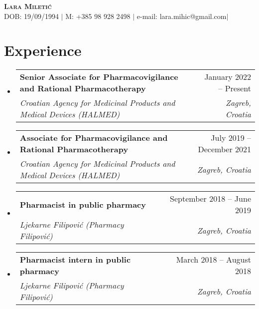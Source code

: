 \documentclass[letterpaper,11pt]{article}
\makeatletter
\newcommand{\resumeItem}[1]{
  \item\small{
    {#1 \vspace{-2pt}}
  }
}
\newcommand{\resumeSubheading}[4]{
  \vspace{-2pt}\item
    \begin{tabular*}{0.97\textwidth}[t]{l@{\extracolsep{\fill}}r}
      \textbf{#1} & #2 \\
      \textit{\small#3} & \textit{\small #4} \\
    \end{tabular*}\vspace{-7pt}
}
\newcommand{\resumeSubHeadingListStart}{\begin{itemize}[leftmargin=0.15in, label={}]}
\newcommand{\resumeSubHeadingListEnd}{\end{itemize}}
\newcommand{\resumeItemListStart}{\begin{itemize}}
\newcommand{\resumeItemListEnd}{\end{itemize}\vspace{-5pt}}
\makeatother
\begin{document}
\begin{center}
    \textbf{\Huge \scshape Lara Miletić} \\ \vspace{1pt}
    \small DOB: 19/09/1994 $|$
    \small M: +385 98 928 2498 $|${ e-mail: lara.mihic@gmail.com}$|$

\end{center}
\section{{Experience}}
  \resumeSubHeadingListStart
      \resumeSubheading
      {{Senior Associate for Pharmacovigilance and Rational Pharmacotherapy}}{January 2022 -- Present}
      {Croatian Agency for Medicinal Products and Medical Devices (HALMED)}{Zagreb, Croatia}

    \resumeSubheading
      {{Associate for Pharmacovigilance and Rational Pharmacotherapy}}{July 2019 -- December 2021}
      {Croatian Agency for Medicinal Products and Medical Devices (HALMED)}{Zagreb, Croatia}
    
     \resumeSubheading
      {{Pharmacist in public pharmacy}}{September 2018 -- June 2019}
      {Ljekarne Filipović (Pharmacy Filipović)}{Zagreb, Croatia}
      \resumeSubheading
      {{Pharmacist intern in public pharmacy}}{March 2018 -- August 2018}
      {Ljekarne Filipović (Pharmacy Filipović)}{Zagreb, Croatia}
  \resumeSubHeadingListEnd
\end{document}
